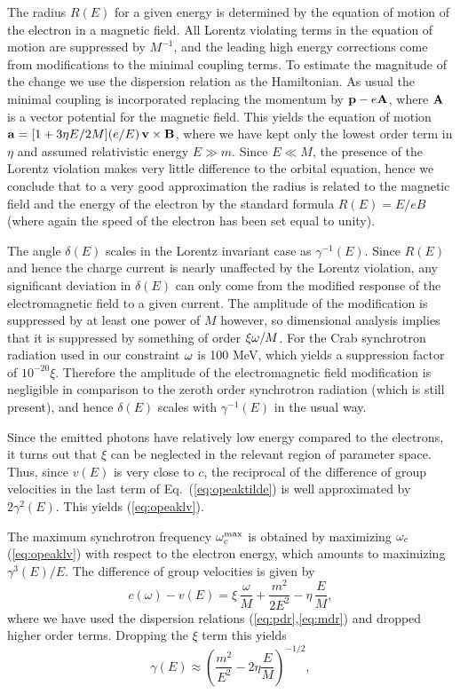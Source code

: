\documentclass[12pt]{article}
\begin{document}
The radius $R(E)$ for a given energy is determined by the
equation of motion of the electron in a magnetic
field. All Lorentz violating terms in the equation of
motion are suppressed by $M^{-1}$, and the leading high
energy corrections come from modifications to the minimal
coupling terms. To estimate the magnitude of the change
we use the dispersion relation as the Hamiltonian. As
usual the minimal coupling is incorporated replacing the
momentum by ${\bf p} - e{\bf A}$, where ${\bf A}$ is a
vector potential for the magnetic field. This yields the
equation of motion ${\bf a}=[1 + 3\eta E/2M](e/E)\, {\bf
  v}\times{\bf B}$, where we have kept only the lowest
order term in $\eta$ and assumed relativistic energy
$E\gg m$. Since $E\ll M$, the presence of the Lorentz
violation makes very little difference to the orbital
equation, hence we conclude that to a very good
approximation the radius is related to the magnetic field
and the energy of the electron by the standard formula
$R(E)= E/eB$ (where again the speed of the electron has
been set equal to unity).

The angle $\delta(E)$ scales in the Lorentz invariant
case as $\gamma^{-1}(E)$. Since $R(E)$ and hence the
charge current is nearly unaffected by the Lorentz
violation, any significant deviation in $\delta(E)$ can
only come from the modified response of the
electromagnetic field to a given current.  The amplitude
of the modification is suppressed by at least one power
of $M$ however, so dimensional analysis implies that it
is suppressed by something of order $\xi \omega/M$. For the
Crab synchrotron radiation used in our constraint $\omega$ is
100 MeV, which yields a suppression factor of
$10^{-20}\xi$. Therefore the amplitude of the
electromagnetic field modification is negligible in
comparison to the zeroth order synchrotron radiation
(which is still present), and hence $\delta(E)$ scales
with $\gamma^{-1}(E)$ in the usual way.


Since the emitted photons have relatively low energy
compared to the electrons, it turns out that $\xi$ can be
neglected in the relevant region of parameter
space. Thus, since $v(E)$ is very close to $c$, the
reciprocal of the difference of group velocities in the
last term of Eq.~(\ref{eq:opeaktilde}) is well
approximated by $2\gamma^2(E)$. This yields
(\ref{eq:opeaklv}).

The maximum synchrotron frequency $\omega_c^{\rm max}$ is
obtained by maximizing $\omega_c$ (\ref{eq:opeaklv}) with
respect to the electron energy, which amounts to
maximizing $\gamma^3(E)/E$.  The difference of group
velocities is given by
%
\begin{equation}
 c(\omega)-v(E)= \xi\, \frac{\omega}{M} + \frac{m^2}{2E^2} -
 \eta\, \frac{E}{M},
 \label{eq:vdiff}
\end{equation}
%
where we have used the dispersion relations
(\ref{eq:pdr},\ref{eq:mdr}) and dropped higher order terms.
Dropping the $\xi$ term this yields
%
\begin{equation}
 \gamma(E)\approx
  \left(\frac{m^2}{E^2}-2\eta\frac{E}{M} \right)^{-1/2},
   \label{eq:gm}
\end{equation}
%
\end{document}
